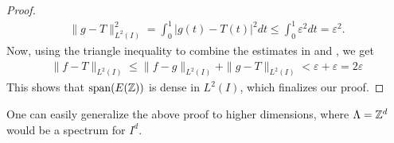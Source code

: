 \documentclass[../thesis.tex]{subfiles}
\begin{document}
\begin{proof}
\begin{align}
        \| g-T \|_{L^2(I)}^2 = \int_0^1 \left|g(t)-T(t) \right|^2dt \leq \int_0^1 \varepsilon^2 dt = \varepsilon^2.
    \end{align}
    Now, using the triangle inequality to combine the estimates in  and , we get
    \begin{align*}
        \| f-T\|_{L^2(I)} \leq  \| f-g\|_{L^2(I)} +\| g-T\|_{L^2(I)} < \varepsilon + \varepsilon =  2 \varepsilon
    \end{align*}
    This shows that $\operatorname{span}(E(\mathbb{Z}))$ is dense in $L^2(I)$, which finalizes our proof.
\end{proof}

One can easily generalize the above proof to higher dimensions, where $\Lambda = \mathbb{Z}^d$ would be a spectrum for $I^d$. %
\end{document}
